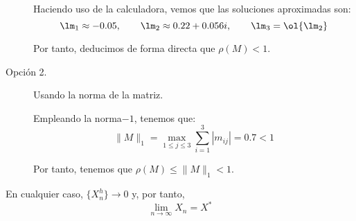 \begin{ejercicio}
\begin{description}
    Haciendo uso de la calculadora, vemos que las soluciones aproximadas son:
    \begin{equation*}
        \lm_1 \approx -0.05,\qquad
        \lm_2 \approx 0.22 + 0.056i,\qquad
        \lm_3 = \ol{\lm_2}
    \end{equation*}

    Por tanto, deducimos de forma directa que $\rho(M)<1$.

    \item[Opción 2.] Usando la norma de la matriz.
    
    Empleando la norma$-1$, tenemos que:
    \begin{equation*}
        \|M\|_1 = \max_{1\leq j\leq 3}\sum_{i=1}^3|m_{ij}| = 0.7 < 1
    \end{equation*}

    Por tanto, tenemos que $\rho(M)\leq \|M\|_1 < 1$.
\end{description}

En cualquier caso, $\{X_n^{h}\}\to 0$ y, por tanto,
\begin{equation*}
    \lim_{n\to \infty} X_n = X^\ast
\end{equation*}
\end{ejercicio}


